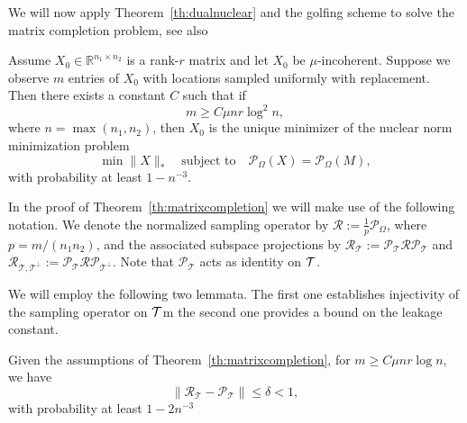 We will now apply Theorem~\ref{th:dualnuclear} and the golfing scheme to solve the matrix completion problem, see also~\cite{CR08,gross2011recovering}



\begin{theorem}\label{th:matrixcompletion}
Assume $X_0 \in \mathbb{R}^{n_1 \times n_2}$ is a rank-$r$ matrix and let $X_0$ be $\mu$-incoherent.  
Suppose we observe $m$ entries of $X_0$ with locations sampled uniformly with replacement. 
Then there exists a constant $C$ such that if
$$m \ge C \mu n r \log^2 n,$$
where $n = \max(n_1, n_2)$,
then  $X_0$ is the unique minimizer of the nuclear norm minimization problem
$$\min \|X\|_* \quad \text{subject to} \quad \mathcal{P}_\Omega(X) = \mathcal{P}_\Omega(M),$$
with probability at least $1-n^{-3}$.
\end{theorem}

In the proof of Theorem~\ref{th:matrixcompletion} we will make use of the following notation. We denote the
normalized sampling operator by $\mathcal{R} := \frac{1}{p} \mathcal{P}_\Omega$, where $p = m/(n_1 n_2)$, and the
associated subspace projections by
$\mathcal{R}_{\mathcal{T}}  := \mathcal{P}_{\mathcal{T}} \mathcal{R} \mathcal{P}_{\mathcal{T}}$ and 
$\mathcal{R}_{\mathcal{T}, \mathcal{T}^\perp}  := \mathcal{P}_{\mathcal{T}} \mathcal{R} \mathcal{P}_{\mathcal{T}^\perp}$. Note  that $\mathcal{P}_{\mathcal{T}}$  acts as identity on $\mathcal{T}$.

We will employ the following two lemmata. The first one establishes injectivity of the sampling operator on $\mathcal{T}$m the second one provides a bound on the leakage constant.

\begin{lemma}\label{le:matrixinjectivity} Given the assumptions of Theorem~\ref{th:matrixcompletion}, for $m \ge C \mu n r \log n$, we have
$$\|\mathcal{R}_{\mathcal{T}} - \mathcal{P}_{\mathcal{T}}\| \le \delta < 1,$$
 with probability at least $1 - 2n^{-3}$
\end{lemma}




